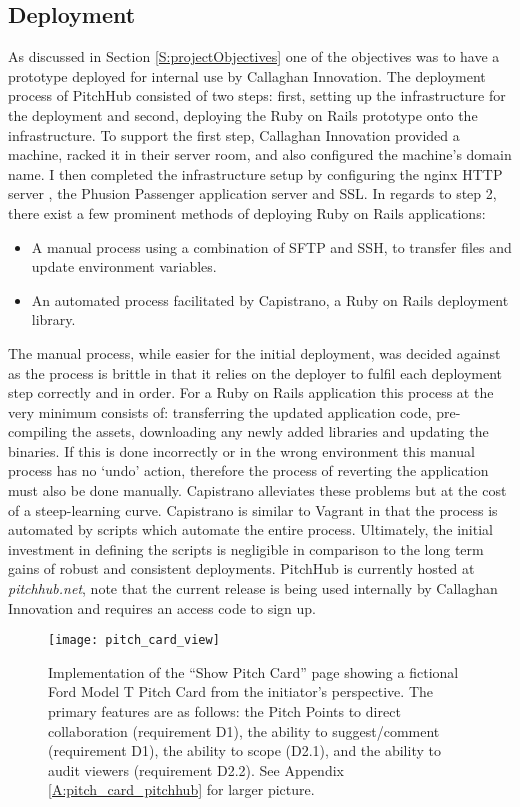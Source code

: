 \subsection{Deployment}
As discussed in Section \ref{S:projectObjectives} one of the objectives was to have a prototype deployed for internal use by Callaghan Innovation. The deployment process of PitchHub consisted of two steps: first, setting up the infrastructure for the deployment and second, deploying the Ruby on Rails prototype onto the infrastructure. To support the first step, Callaghan Innovation provided a machine, racked it in their server room, and also configured the machine's domain name. I then completed the infrastructure setup by configuring the nginx HTTP server \cite{nginx2:online}, the Phusion Passenger application server \cite{phusionPassenger:online} and SSL. In regards to step 2, there exist a few prominent methods of deploying Ruby on Rails applications:
\begin{itemize}
    \item A manual process using a combination of SFTP and SSH, to transfer files and update environment variables.
    \item An automated process facilitated by Capistrano, a Ruby on Rails deployment library.
\end{itemize}

The manual process, while easier for the initial deployment, was decided against as the process is brittle in that it relies on the deployer to fulfil each deployment step correctly and in order. For a Ruby on Rails application this process at the very minimum consists of: transferring the updated application code, pre-compiling the assets, downloading any newly added libraries and updating the binaries. If this is done incorrectly or in the wrong environment this manual process has no `undo' action, therefore the process of reverting the application must also be done manually. Capistrano alleviates these problems but at the cost of a steep-learning curve. Capistrano is similar to Vagrant in that the process is automated by scripts which automate the entire process. Ultimately, the initial investment in defining the scripts is negligible in comparison to the long term gains of robust and consistent deployments. PitchHub is currently hosted at \textit{pitchhub.net}, note that the current release is being used internally by Callaghan Innovation and requires an access code to sign up.

\begin{figure}[ht]
    \centering
    \texttt{[image: pitch\_card\_view]}
    \caption{Implementation of the ``Show Pitch Card'' page showing a fictional Ford Model T Pitch Card from the initiator's perspective. The primary features are as follows: the Pitch Points to direct collaboration (requirement D1), the ability to suggest/comment (requirement D1), the ability to scope (D2.1), and the ability to audit viewers (requirement D2.2). See Appendix \ref{A:pitch_card_pitchhub} for larger picture.}
    \label{fig:show_pitch_card}
\end{figure}


